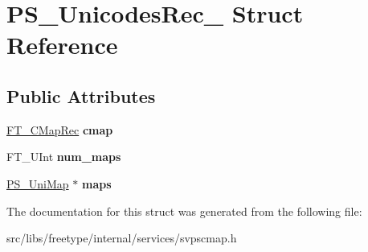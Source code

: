 \hypertarget{struct_p_s___unicodes_rec__}{
\section{PS\_\-UnicodesRec\_\- Struct Reference}
\label{struct_p_s___unicodes_rec__}
}
\subsection*{Public Attributes}
\begin{DoxyCompactItemize}
\item 
\hypertarget{struct_p_s___unicodes_rec___a4c3e28cb86c8a7039107437dcf995da7}{
\hyperlink{struct_f_t___c_map_rec__}{FT\_\-CMapRec} {\bfseries cmap}}
\label{struct_p_s___unicodes_rec___a4c3e28cb86c8a7039107437dcf995da7}

\item 
\hypertarget{struct_p_s___unicodes_rec___abbc3617f13363ddcf851ee229752b08d}{
FT\_\-UInt {\bfseries num\_\-maps}}
\label{struct_p_s___unicodes_rec___abbc3617f13363ddcf851ee229752b08d}

\item 
\hypertarget{struct_p_s___unicodes_rec___abd0ff1abe19a2a6a838b631ec81d22cd}{
\hyperlink{struct_p_s___uni_map__}{PS\_\-UniMap} $\ast$ {\bfseries maps}}
\label{struct_p_s___unicodes_rec___abd0ff1abe19a2a6a838b631ec81d22cd}

\end{DoxyCompactItemize}


The documentation for this struct was generated from the following file:\begin{DoxyCompactItemize}
\item 
src/libs/freetype/internal/services/svpscmap.h\end{DoxyCompactItemize}
